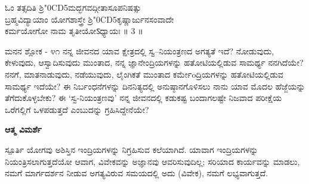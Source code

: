 \begin{center}
ಓಂ ತತ್ಸದಿತಿ ಶ್ರಿ\!\char"0CD5ಮದ್ಭಗವದ್ಗೀತಾಸೂಪನಿಷತ್ಸು \\ಬ್ರಹ್ಮವಿದ್ಯಾಯಾಂ ಯೋಗಶಾಸ್ತ್ರೇ ಶ್ರಿ\!\char"0CD5ಕೃಷ್ಣಾರ್ಜುನಸಂವಾದೇ\\
ಕರ್ಮಯೋಗೋ ನಾಮ ತೃತೀಯೋऽಧ್ಯಾಯಃ ॥ 3 ॥
\end{center}

\newpage
\begin{mananam}{\mananamfont ಮನನ ಶ್ಲೋಕ - ೪೧}
\mananamtext ನನ್ನ ಜೀವನದ ಯಾವ ಕ್ಷೇತ್ರದಲ್ಲಿ ಸ್ವ–ನಿಯಂತ್ರಣದ ಅಗತ್ಯತೆ ಇದೆ? ನೋಡುವುದು, ಕೇಳುವುದು, ಆಸ್ವಾದಿಸುವುದು ಮುಂತಾದ, ನನ್ನ ಜ್ಞಾನೇಂದ್ರಿಯಗಳನ್ನು ಹತೋಟಿಯಲ್ಲಿಡುವ ಸಾಮರ್ಥ್ಯ ನನಗಿದೆಯೇ? ನನಗೆ,  ಮಾತನಾಡುವುದು, ನಡೆಯುವುದು, ಲೈಂಗಿಕತೆ ಮುಂತಾದ ಕರ್ಮೇoದ್ರಿಯಗಳನ್ನು  ಹತೋಟಿಯಲ್ಲಿಡುವ ಸಾಮರ್ಥ್ಯ ಇದೆಯೇ? ಈ ನಿರ್ಬಂಧನೆಗಳನ್ನು ದಿನನಿತ್ಯದಲ್ಲಿ ಅನುಷ್ಠಾನಗೊಳಿಸಲು ನಾನು ಯಾವ ಮೊದಲ ಹೆಜ್ಜೆಯನ್ನು ತೆಗೆದುಕೊಳ್ಳಬೇಕು? ಈ ‘ಸ್ವ-ನಿಯಂತ್ರಣವು’ ನನ್ನ ಜೀವನದಲ್ಲಿ ಕಡುಕಷ್ಟ ಬಂದಾಗಲಷ್ಟೇ ನಿಜವಾದ ಪರೀಕ್ಷೆಯ ಒರೆಗಲ್ಲಿಗೆ ಒಳಪಡುತ್ತದೆ ಎಂಬುದನ್ನು ಗ್ರಹಿಸಿದ್ದೇನೆಯೇ? 
\end{mananam}
\WritingHand\enspace\textbf{ಆತ್ಮ ವಿಮರ್ಶೆ}\\
\begin{inspiration}{\mananamfont ಸ್ಪೂರ್ತಿ}
\mananamtext ಯೋಗವು ಅಶಿಸ್ತಿನ ಇಂದ್ರಿಯಗಳನ್ನು ನಿಗ್ರಹಿಸುವ ಕಲೆಯಾಗಿದೆ. ಯಾವಾಗ ಇಂದ್ರಿಯಗಳನ್ನು ನಿಯಂತ್ರಿಸಲಾಗುತ್ತದೆಯೋ ಆವಾಗ, ವಿವೇಕವನ್ನು ಅಜ್ಞಾನವು ಆವರಿಸುವುದಿಲ್ಲ; ಸರಿಯಾದ ಕಾರ್ಯವನ್ನು ಮಾಡಲು, ನಮಗೆ ಮಾರ್ಗದರ್ಶನ ನೀಡುವ ಅಗತ್ಯವಿರುವ ಸಮಯದಲ್ಲಿ ಅದು (ವಿವೇಕ), ನಮಗೆ ಲಭ್ಯವಾಗುತ್ತದೆ.
\end{inspiration}

